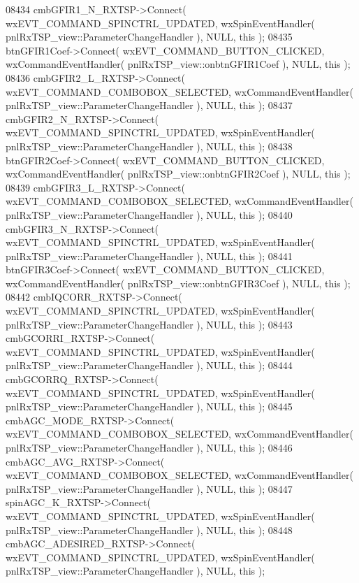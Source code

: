 \begin{DoxyCode}
08434     cmbGFIR1_N_RXTSP->Connect( wxEVT\_COMMAND\_SPINCTRL\_UPDATED, wxSpinEventHandler( 
      pnlRxTSP_view::ParameterChangeHandler ), NULL, \textcolor{keyword}{this} );
08435     btnGFIR1Coef->Connect( wxEVT\_COMMAND\_BUTTON\_CLICKED, wxCommandEventHandler( 
      pnlRxTSP_view::onbtnGFIR1Coef ), NULL, \textcolor{keyword}{this} );
08436     cmbGFIR2_L_RXTSP->Connect( wxEVT\_COMMAND\_COMBOBOX\_SELECTED, wxCommandEventHandler( 
      pnlRxTSP_view::ParameterChangeHandler ), NULL, \textcolor{keyword}{this} );
08437     cmbGFIR2_N_RXTSP->Connect( wxEVT\_COMMAND\_SPINCTRL\_UPDATED, wxSpinEventHandler( 
      pnlRxTSP_view::ParameterChangeHandler ), NULL, \textcolor{keyword}{this} );
08438     btnGFIR2Coef->Connect( wxEVT\_COMMAND\_BUTTON\_CLICKED, wxCommandEventHandler( 
      pnlRxTSP_view::onbtnGFIR2Coef ), NULL, \textcolor{keyword}{this} );
08439     cmbGFIR3_L_RXTSP->Connect( wxEVT\_COMMAND\_COMBOBOX\_SELECTED, wxCommandEventHandler( 
      pnlRxTSP_view::ParameterChangeHandler ), NULL, \textcolor{keyword}{this} );
08440     cmbGFIR3_N_RXTSP->Connect( wxEVT\_COMMAND\_SPINCTRL\_UPDATED, wxSpinEventHandler( 
      pnlRxTSP_view::ParameterChangeHandler ), NULL, \textcolor{keyword}{this} );
08441     btnGFIR3Coef->Connect( wxEVT\_COMMAND\_BUTTON\_CLICKED, wxCommandEventHandler( 
      pnlRxTSP_view::onbtnGFIR3Coef ), NULL, \textcolor{keyword}{this} );
08442     cmbIQCORR_RXTSP->Connect( wxEVT\_COMMAND\_SPINCTRL\_UPDATED, wxSpinEventHandler( 
      pnlRxTSP_view::ParameterChangeHandler ), NULL, \textcolor{keyword}{this} );
08443     cmbGCORRI_RXTSP->Connect( wxEVT\_COMMAND\_SPINCTRL\_UPDATED, wxSpinEventHandler( 
      pnlRxTSP_view::ParameterChangeHandler ), NULL, \textcolor{keyword}{this} );
08444     cmbGCORRQ_RXTSP->Connect( wxEVT\_COMMAND\_SPINCTRL\_UPDATED, wxSpinEventHandler( 
      pnlRxTSP_view::ParameterChangeHandler ), NULL, \textcolor{keyword}{this} );
08445     cmbAGC_MODE_RXTSP->Connect( wxEVT\_COMMAND\_COMBOBOX\_SELECTED, wxCommandEventHandler( 
      pnlRxTSP_view::ParameterChangeHandler ), NULL, \textcolor{keyword}{this} );
08446     cmbAGC_AVG_RXTSP->Connect( wxEVT\_COMMAND\_COMBOBOX\_SELECTED, wxCommandEventHandler( 
      pnlRxTSP_view::ParameterChangeHandler ), NULL, \textcolor{keyword}{this} );
08447     spinAGC_K_RXTSP->Connect( wxEVT\_COMMAND\_SPINCTRL\_UPDATED, wxSpinEventHandler( 
      pnlRxTSP_view::ParameterChangeHandler ), NULL, \textcolor{keyword}{this} );
08448     cmbAGC_ADESIRED_RXTSP->Connect( wxEVT\_COMMAND\_SPINCTRL\_UPDATED, wxSpinEventHandler( 
      pnlRxTSP_view::ParameterChangeHandler ), NULL, \textcolor{keyword}{this} );

\end{DoxyCode}
